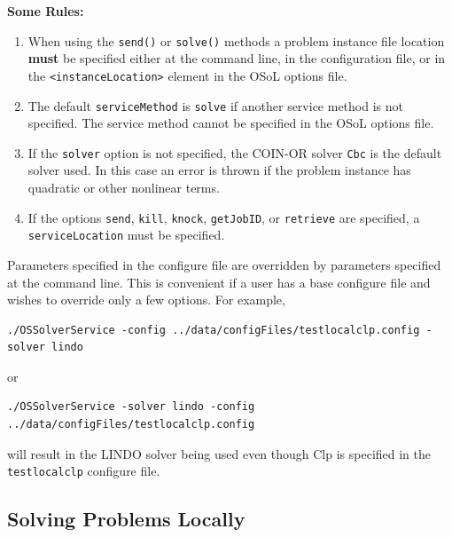 \documentclass[11pt]{article}
\renewcommand{\_}{{\char"5F}}
\renewcommand{\{}{{\char"7B}}
\renewcommand{\}}{{\char"7D}}
\renewcommand{\^}{{\char"0D}}
\renewcommand{\'}{{\char"0D}}
\begin{document}
\begin{enumerate}[Step 1:]
{\bf Some Rules:}

\begin{enumerate}
\item{}  When using the {\tt send()} or  {\tt solve()} methods 
a problem instance file location {\bf must} be specified either at  the command line, in the configuration file, 
or in the {\tt <instanceLocation>} element in the OSoL options file.

\item{}  The default {\tt serviceMethod} is {\tt solve} if another service method is not specified.   
The service method cannot be specified in the OSoL options file.

\item{}  If the {\tt solver} option is not specified, the COIN-OR solver {\tt Cbc} is the default 
solver used. In this case an error is thrown if the problem instance has quadratic or other nonlinear terms.

\item{}  If the options {\tt send}, {\tt kill}, 
{\tt knock},  {\tt getJobID},  
or {\tt retrieve} are specified, 
a  {\tt serviceLocation} must be specified.

\end{enumerate}



Parameters specified in the configure file are overridden by parameters specified at the command line. 
This is convenient if a user has a base configure file and wishes to override only a few options. For example,
\begin{verbatim}
./OSSolverService -config ../data/configFiles/testlocalclp.config -solver lindo
\end{verbatim}
or
\begin{verbatim}
./OSSolverService -solver lindo -config ../data/configFiles/testlocalclp.config
\end{verbatim}
will result in the LINDO solver being used even though Clp is specified in the 
{\tt testlocalclp} configure file.



\subsection{Solving Problems Locally}


\end{enumerate}
\end{document}
